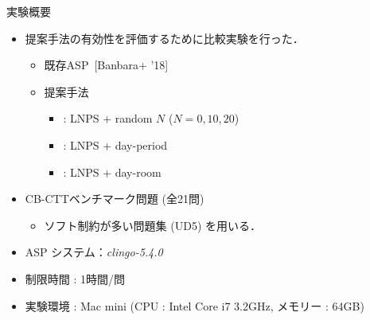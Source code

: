 \documentclass[11pt,dvipdfmx,handout]{beamer}
\begin{document}
\begin{frame}{実験概要}
  \begin{itemize}
  \item 提案手法の有効性を評価するために比較実験を行った．
    \begin{itemize}
    \item 既存ASP~[Banbara+ '18]
    \item 提案手法
      \begin{itemize}
      \item {}: LNPS + random $N$ ($N=0, 10, 20$)
      \item {}: LNPS + day-period
      \item {}: LNPS + day-room
      \end{itemize}
    \end{itemize}
  \item CB-CTTベンチマーク問題 (全21問)
    \begin{itemize}
    \item ソフト制約が多い問題集 (UD5) を用いる．
    \end{itemize}
  \item ASP システム：\textit{clingo-5.4.0}
  \item 制限時間 : 1時間/問
  \item 実験環境 : Mac mini (CPU : Intel Core i7 3.2GHz, メモリー : 64GB) 
  \end{itemize}
\end{frame}
\newenvironment{tableA}{%
  \renewcommand{\arraystretch}{0.85}
  \begin{tabular}[t]{c||r|r|r|r|r|r}
    \lw{問題名} & \lw{既存ASP} & \multicolumn{5}{c}{提案手法}\\\cline{3-7}
     &  & R-0 & R-10 & R-20 & DP & DR\\\hline
    }{%
    \hline
  \end{tabular}
}
\end{document}
